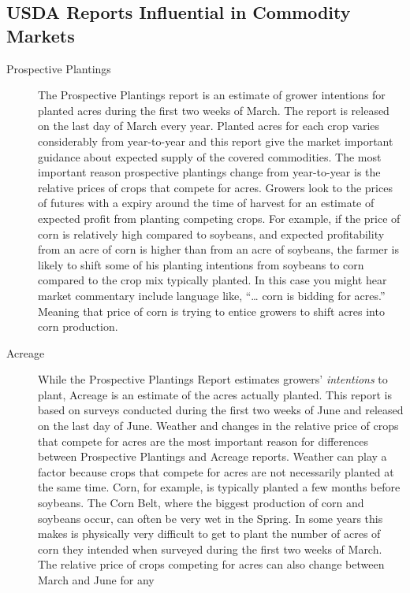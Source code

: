 \documentclass[
  letterpaper,
  DIV=11,
  numbers=noendperiod]{scrreprt}
\begin{document}
\hypertarget{usda-reports-influential-in-commodity-markets}{%
\subsection{USDA Reports Influential in Commodity
Markets}\label{usda-reports-influential-in-commodity-markets}}

\begin{description}
\item[Prospective Plantings]
The Prospective Plantings report is an estimate of grower intentions for
planted acres during the first two weeks of March. The report is
released on the last day of March every year. Planted acres for each
crop varies considerably from year-to-year and this report give the
market important guidance about expected supply of the covered
commodities. The most important reason prospective plantings change from
year-to-year is the relative prices of crops that compete for acres.
Growers look to the prices of futures with a expiry around the time of
harvest for an estimate of expected profit from planting competing
crops. For example, if the price of corn is relatively high compared to
soybeans, and expected profitability from an acre of corn is higher than
from an acre of soybeans, the farmer is likely to shift some of his
planting intentions from soybeans to corn compared to the crop mix
typically planted. In this case you might hear market commentary include
language like, ``\ldots{} corn is bidding for acres.'' Meaning that
price of corn is trying to entice growers to shift acres into corn
production.
\item[Acreage]
While the Prospective Plantings Report estimates growers'
\emph{intentions} to plant, Acreage is an estimate of the acres actually
planted. This report is based on surveys conducted during the first two
weeks of June and released on the last day of June. Weather and changes
in the relative price of crops that compete for acres are the most
important reason for differences between Prospective Plantings and
Acreage reports. Weather can play a factor because crops that compete
for acres are not necessarily planted at the same time. Corn, for
example, is typically planted a few months before soybeans. The Corn
Belt, where the biggest production of corn and soybeans occur, can often
be very wet in the Spring. In some years this makes is physically very
difficult to get to plant the number of acres of corn they intended when
surveyed during the first two weeks of March. The relative price of
crops competing for acres can also change between March and June for any

\end{description}
\end{document}
